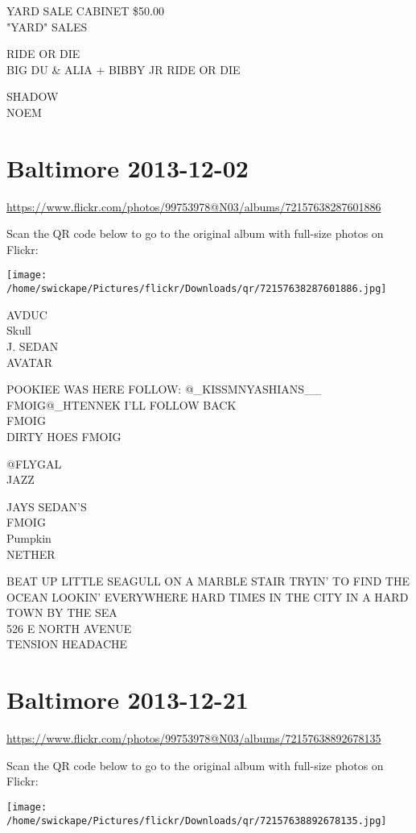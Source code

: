 \documentclass[10pt,letterpaper]{article}
\begin{document}
YARD SALE CABINET \$50.00\\
"YARD" SALES

RIDE OR DIE\\
BIG DU \& ALIA + BIBBY JR RIDE OR DIE

SHADOW\\
NOEM
\pagebreak

\section*{Baltimore 2013-12-02}

\url{https://www.flickr.com/photos/99753978@N03/albums/72157638287601886}

Scan the QR code below to go to the original album with full-size photos on Flickr:

\texttt{[image: /home/swickape/Pictures/flickr/Downloads/qr/72157638287601886.jpg]}
\pagebreak

AVDUC\\
Skull\\
J. SEDAN\\
AVATAR

POOKIEE WAS HERE FOLLOW: @\_KISSMNYASHIANS\_\_\\
FMOIG@\_HTENNEK I'LL FOLLOW BACK\\
FMOIG\\
DIRTY HOES FMOIG

@FLYGAL\\
JAZZ

JAYS SEDAN'S\\
FMOIG\\
Pumpkin\\
NETHER

BEAT UP LITTLE SEAGULL ON A MARBLE STAIR TRYIN' TO FIND THE OCEAN LOOKIN' EVERYWHERE HARD TIMES IN THE CITY IN A HARD TOWN BY THE SEA\\
526 E NORTH AVENUE\\
TENSION HEADACHE
\pagebreak

\section*{Baltimore 2013-12-21}

\url{https://www.flickr.com/photos/99753978@N03/albums/72157638892678135}

Scan the QR code below to go to the original album with full-size photos on Flickr:

\texttt{[image: /home/swickape/Pictures/flickr/Downloads/qr/72157638892678135.jpg]}
\pagebreak
\end{document}
